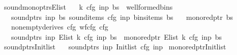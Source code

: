 \begin{isabellebody}
\isadelimproof
%
\endisadelimproof
%
\isatagproof
%
\endisatagproof
{\isafoldproof}%
%
\isadelimproof
\isanewline
%
\endisadelimproof
{}\isamarkupfalse%
\ sound{\isacharunderscore}{\kern0pt}mono{\isacharunderscore}{\kern0pt}ptrs{\isacharunderscore}{\kern0pt}E{\isacharunderscore}{\kern0pt}list{\isacharcolon}{\kern0pt}\isanewline
\ \ \ {\isachardoublequoteopen}{\isacharparenleft}{\kern0pt}k{\isacharcomma}{\kern0pt}\ cfg{\isacharcomma}{\kern0pt}\ inp{\isacharcomma}{\kern0pt}\ bs{\isacharparenright}{\kern0pt}\ {\isasymin}\ wellformed{\isacharunderscore}{\kern0pt}bins{\isachardoublequoteclose}\isanewline
\ \ \ {\isachardoublequoteopen}sound{\isacharunderscore}{\kern0pt}ptrs\ inp\ bs{\isachardoublequoteclose}\ {\isachardoublequoteopen}sound{\isacharunderscore}{\kern0pt}items\ cfg\ inp\ {\isacharparenleft}{\kern0pt}bins{\isacharunderscore}{\kern0pt}items\ bs{\isacharparenright}{\kern0pt}{\isachardoublequoteclose}\isanewline
\ \ \ {\isachardoublequoteopen}mono{\isacharunderscore}{\kern0pt}red{\isacharunderscore}{\kern0pt}ptr\ bs{\isachardoublequoteclose}\isanewline
\ \ \ {\isachardoublequoteopen}nonempty{\isacharunderscore}{\kern0pt}derives\ cfg{\isachardoublequoteclose}\ {\isachardoublequoteopen}wf{\isacharunderscore}{\kern0pt}cfg\ cfg{\isachardoublequoteclose}\isanewline
\ \ \ {\isachardoublequoteopen}sound{\isacharunderscore}{\kern0pt}ptrs\ inp\ {\isacharparenleft}{\kern0pt}E{\isacharunderscore}{\kern0pt}list\ k\ cfg\ inp\ bs{\isacharparenright}{\kern0pt}\ {\isasymand}\ mono{\isacharunderscore}{\kern0pt}red{\isacharunderscore}{\kern0pt}ptr\ {\isacharparenleft}{\kern0pt}E{\isacharunderscore}{\kern0pt}list\ k\ cfg\ inp\ bs{\isacharparenright}{\kern0pt}{\isachardoublequoteclose}%
\isadelimproof
%
\endisadelimproof
%
\isatagproof
%
\endisatagproof
{\isafoldproof}%
%
\isadelimproof
\isanewline
%
\endisadelimproof
{}\isamarkupfalse%
\ sound{\isacharunderscore}{\kern0pt}ptrs{\isacharunderscore}{\kern0pt}Init{\isacharunderscore}{\kern0pt}list{\isacharcolon}{\kern0pt}\isanewline
\ \ \ {\isachardoublequoteopen}sound{\isacharunderscore}{\kern0pt}ptrs\ inp\ {\isacharparenleft}{\kern0pt}Init{\isacharunderscore}{\kern0pt}list\ cfg\ inp{\isacharparenright}{\kern0pt}{\isachardoublequoteclose}%
\isadelimproof
%
\endisadelimproof
%
\isatagproof
%
\endisatagproof
{\isafoldproof}%
%
\isadelimproof
\isanewline
%
\endisadelimproof
{}\isamarkupfalse%
\ mono{\isacharunderscore}{\kern0pt}red{\isacharunderscore}{\kern0pt}ptr{\isacharunderscore}{\kern0pt}Init{\isacharunderscore}{\kern0pt}list{\isacharcolon}{\kern0pt}\isanewline

\end{isabellebody}
